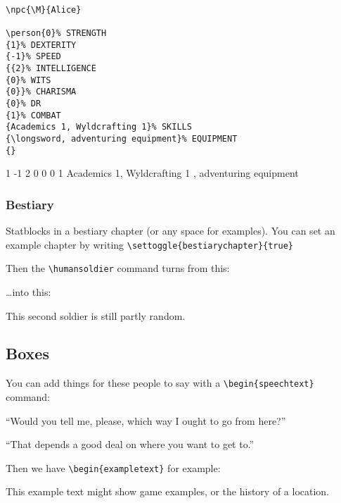 \documentclass[a4paper,openany]{book}
\begin{document}
\begin{multicols}{2}
\begin{verbatim}

\npc{\M}{Alice}

\person{0}% STRENGTH
{1}% DEXTERITY 
{-1}% SPEED
{{2}% INTELLIGENCE
{0}% WITS
{0}}% CHARISMA
{0}% DR
{1}% COMBAT
{Academics 1, Wyldcrafting 1}% SKILLS
{\longsword, adventuring equipment}% EQUIPMENT
{}

\end{verbatim}


{1}%
{-1}%
{{2}%
{0}%
{0}}%
{0}%
{1}%
{Academics 1, Wyldcrafting 1}%
{\longsword, adventuring equipment}%
{}

\subsubsection{Bestiary}

Statblocks in a bestiary chapter (or any space for examples).
You can set an example chapter by writing \verb"\settoggle{bestiarychapter}{true}"

Then the \verb"\humansoldier" command turns from this:

\humansoldier

\ldots into this:


\humansoldier

This second soldier is still partly random.

\subsection{Boxes}

You can add things for these people to say with a \verb"\begin{speechtext}" command:

\begin{speechtext}

  ``Would you tell me, please, which way I ought to go from here?''

  ``That depends a good deal on where you want to get to.''

\end{speechtext}

Then we have \verb"\begin{exampletext}" for example:

\begin{exampletext}
  This example text might show game examples, or the history of a location.


\end{exampletext}
\end{multicols}
\end{document}
